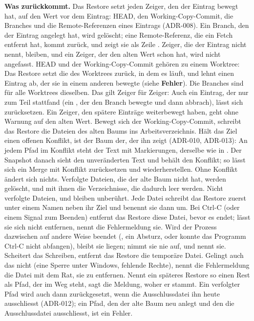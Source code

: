 {\bf Was zurückkommt.} Das Restore setzt jeden Zeiger, den der Eintrag bewegt hat,
auf den Wert vor dem Eintrag: HEAD, den Working-Copy-Commit, die Branches und die
Remote-Referenzen eines Eintrags  (ADR-008).
Ein Branch, den der Eintrag angelegt hat, wird gelöscht; eine Remote-Referenz, die ein Fetch
entfernt hat, kommt zurück, und  zeigt sie als Zeile .
Zeiger, die der Eintrag nicht nennt, bleiben, und ein Zeiger, der den alten Wert schon hat,
wird nicht angefasst.
HEAD und der Working-Copy-Commit gehören zu einem Worktree: Das Restore setzt die des Worktrees
zurück, in dem es läuft, und lehnt einen Eintrag ab, der sie in einem anderen bewegte (siehe
{\bf Fehler}). Die Branches sind für alle Worktrees dieselben.
Das gilt Zeiger für Zeiger: Auch ein Eintrag, der nur zum Teil stattfand (ein ,
der den Branch bewegte und dann abbrach), lässt sich zurücksetzen.
Ein Zeiger, den spätere Einträge weiterbewegt haben, geht ohne Warnung auf den alten Wert.
Bewegt sich der Working-Copy-Commit, schreibt das Restore die Dateien des alten Baums
ins Arbeitsverzeichnis.
Hält das Ziel einen offenen Konflikt, ist der Baum der, der ihn zeigt (ADR-010, ADR-013):
An jedem Pfad im Konflikt steht der Text mit Markierungen, derselbe wie in .
Der Snapshot danach sieht den unveränderten Text und behält den Konflikt;
so lässt sich ein Merge mit Konflikt zurücksetzen und wiederherstellen.
Ohne Konflikt ändert sich nichts.
Verfolgte Dateien, die der alte Baum nicht hat, werden gelöscht,
und mit ihnen die Verzeichnisse, die dadurch leer werden.
Nicht verfolgte Dateien,  und  bleiben unberührt.
Jede Datei schreibt das Restore zuerst unter einem Namen  neben ihr Ziel
und benennt sie dann um.
Bei Ctrl-C (oder einem Signal zum Beenden) entfernt das Restore diese Datei, bevor es endet;
lässt sie sich nicht entfernen, nennt die Fehlermeldung sie.
Wird der Prozess dazwischen auf andere Weise beendet (, ein Absturz,
oder konnte das Programm Ctrl-C nicht abfangen), bleibt sie liegen;
 nimmt sie nie auf, und  nennt sie.
Scheitert das Schreiben, entfernt das Restore die temporäre Datei.
Gelingt auch das nicht (eine Sperre unter Windows, fehlende Rechte), nennt die Fehlermeldung
die Datei mit dem Rat, sie zu entfernen.
Nennt ein späteres Restore so einen Rest als Pfad, der im Weg steht, sagt die Meldung,
woher er stammt.
Ein verfolgter Pfad wird auch dann zurückgesetzt, wenn die Ausschlussdatei ihn heute
ausschliesst (ADR-012); ein Pfad, den der alte Baum neu anlegt und den die Ausschlussdatei
ausschliesst, ist ein Fehler.

